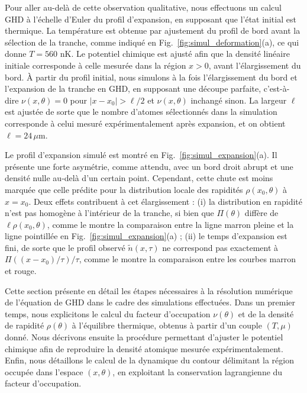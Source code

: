{\color{blue}
Pour aller au-delà de cette observation qualitative, nous effectuons un calcul GHD à l’échelle d’Euler du profil d’expansion, en supposant que l’état initial est thermique.  
La température est obtenue par ajustement du profil de bord avant la sélection de la tranche, comme indiqué en Fig.~\ref{fig:simul_deformation}(a), ce qui donne $T = 560$ nK.  
Le potentiel chimique est ajusté afin que la densité linéaire initiale corresponde à celle mesurée dans la région $x > 0$, avant l’élargissement du bord.  
À partir du profil initial, nous simulons à la fois l’élargissement du bord et l’expansion de la tranche en GHD, en supposant une découpe parfaite, c’est-à-dire $\nu(x,\theta) = 0$ pour $|x - x_0| > \ell/2$ et $\nu(x,\theta)$ inchangé sinon.  
La largeur $\ell$ est ajustée de sorte que le nombre d’atomes sélectionnés dans la simulation corresponde à celui mesuré expérimentalement après expansion, et on obtient $\ell = 24\,\mu$m.  

Le profil d’expansion simulé est montré en Fig.~\ref{fig:simul_expansion}(a).  
Il présente une forte asymétrie, comme attendu, avec un bord droit abrupt et une densité nulle au-delà d’un certain point.  
Cependant, cette chute est moins marquée que celle prédite pour la distribution locale des rapidités $\rho(x_0,\theta)$ à $x = x_0$. Deux effets contribuent à cet élargissement :  
(i) la distribution en rapidité n’est pas homogène à l’intérieur de la tranche, si bien que $\Pi(\theta)$ diffère de $\ell \rho(x_0,\theta)$, comme le montre la comparaison entre la ligne marron pleine et la ligne pointillée en Fig.~\ref{fig:simul_expansion}(a) ;  
(ii) le temps d’expansion est fini, de sorte que le profil observé $\tilde{n}(x, {\tau} )$ ne correspond pas exactement à $\Pi((x-x_0)/\tau)/\tau$, comme le montre la comparaison entre les courbes marron et rouge.

}

Cette section présente en détail les étapes nécessaires à la résolution numérique de l’équation de GHD dans le cadre des simulations effectuées. Dans un premier temps, nous explicitons le calcul du facteur d’occupation $\nu(\theta)$ et de la densité de rapidité $\rho(\theta)$ à l’équilibre thermique, obtenus à partir d’un couple $(T, \mu)$ donné. Nous décrivons ensuite la procédure permettant d’ajuster le potentiel chimique afin de reproduire la densité atomique mesurée expérimentalement. Enfin, nous détaillons le calcul de la dynamique du contour délimitant la région occupée dans l’espace $(x, \theta)$, en exploitant la conservation lagrangienne du facteur d’occupation.

